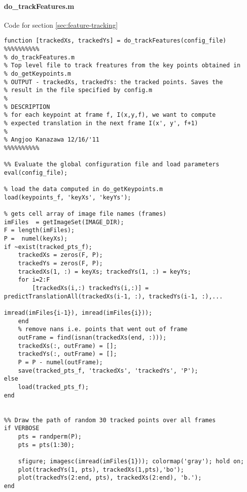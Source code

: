 \paragraph{do\_trackFeatures.m}
Code for section \ref{sec:feature-tracking}
\begin{verbatim}
function [trackedXs, trackedYs] = do_trackFeatures(config_file)
%%%%%%%%%%
% do_trackFeatures.m
% Top level file to track freatures from the key points obtained in
% do_getKeypoints.m
% OUTPUT - trackedXs, trackedYs: the tracked points. Saves the
% result in the file specified by config.m
%
% DESCRIPTION 
% for each keypoint at frame f, I(x,y,f), we want to compute
% expected translation in the next frame I(x', y', f+1)
%
% Angjoo Kanazawa 12/16/'11
%%%%%%%%%%

%% Evaluate the global configuration file and load parameters
eval(config_file);

% load the data computed in do_getKeypoints.m
load(keypoints_f, 'keyXs', 'keyYs');

% gets cell array of image file names (frames)
imFiles  = getImageSet(IMAGE_DIR); 
F = length(imFiles);
P =  numel(keyXs);
if ~exist(tracked_pts_f);
    trackedXs = zeros(F, P);
    trackedYs = zeros(F, P);
    trackedXs(1, :) = keyXs; trackedYs(1, :) = keyYs;
    for i=2:F
        [trackedXs(i,:) trackedYs(i,:)] = predictTranslationAll(trackedXs(i-1, :), trackedYs(i-1, :),...
                                                          imread(imFiles{i-1}), imread(imFiles{i}));
    end
    % remove nans i.e. points that went out of frame
    outFrame = find(isnan(trackedXs(end, :)));
    trackedXs(:, outFrame) = [];
    trackedYs(:, outFrame) = [];
    P = P - numel(outFrame);
    save(tracked_pts_f, 'trackedXs', 'trackedYs', 'P');
else
    load(tracked_pts_f);
end


%% Draw the path of random 30 tracked points over all frames
if VERBOSE
    pts = randperm(P);
    pts = pts(1:30);

    sfigure; imagesc(imread(imFiles{1})); colormap('gray'); hold on;
    plot(trackedYs(1, pts), trackedXs(1,pts),'bo');
    plot(trackedYs(2:end, pts), trackedXs(2:end), 'b.');
end
\end{verbatim}

